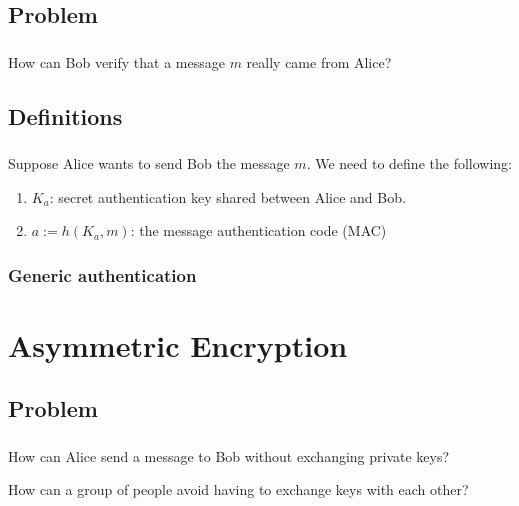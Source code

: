 \documentclass{beamer}
\begin{document}
    \subsection{Problem}
      \begin{frame}
        \frametitle{\insertsubsection}
        How can Bob verify that a message $m$ really came from Alice?
        \begin{center}
          
        \end{center}
      \end{frame}
    \subsection{Definitions}
      \begin{frame}
        \frametitle{\insertsubsection}
        Suppose Alice wants to send Bob the message $m$. We need to define
        the following:
        \begin{enumerate}
          \item $K_a$: secret authentication key shared between Alice and Bob.
          \item $a := h(K_a, m)$: the message authentication code (MAC)
        \end{enumerate}
      \end{frame}
      \begin{frame}
        \frametitle{Generic authentication}
        \begin{center}
          
        \end{center}
      \end{frame}
  \section{Asymmetric Encryption}
    \subsection{Problem}
      \begin{frame}
        \frametitle{\insertsubsection}
        How can Alice send a message to Bob without exchanging private keys?

        How can a group of people avoid having to exchange keys with each other?
      \end{frame}
\end{document}
